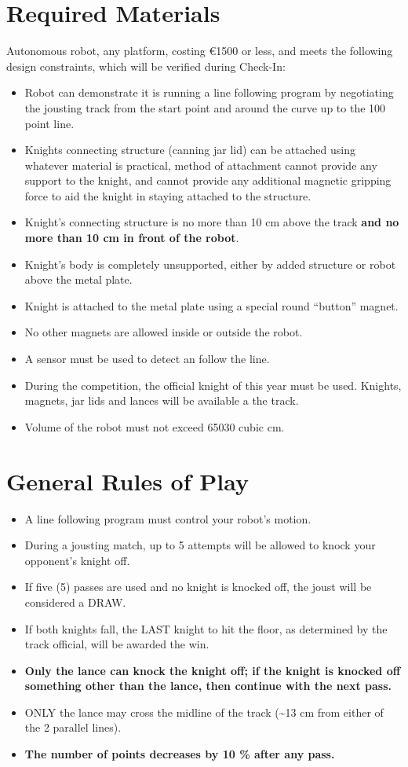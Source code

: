 \documentclass[a4paper,12pt]{article}
\begin{document}
\section{Required Materials}
Autonomous robot, any platform, costing \euro{1500} or less, and meets the following design
constraints, which will be verified during Check-In:
\begin{itemize}
\item Robot can demonstrate it is running a line following program by negotiating the jousting track
from the start point and around the curve up to the 100 point line.
\item Knights connecting structure (canning jar lid) can be attached using whatever material is
practical, method of attachment cannot provide any support to the knight, and cannot provide
any additional magnetic gripping force to aid the knight in staying attached to the structure.
\item Knight’s connecting structure is no more than 10
cm above the track \textbf{and no more than 10 cm in front of the robot}.
\item Knight’s body is completely unsupported, either by added structure or robot above the metal
plate.
\item Knight is attached to the metal plate using a special round “button” magnet.
\item No other magnets are allowed inside or outside the robot.
\item A sensor must be used to detect an follow the line.
\item During the competition, the official knight of this year must be used. Knights, magnets, jar lids and lances will be available a the track.
\item Volume of the robot must not exceed 65030 cubic cm.
\end{itemize}
\section{General Rules of Play}
\begin{itemize}
	\item A line following program must control your robot’s motion.
	\item During a jousting match, up to 5 attempts will be allowed to knock your opponent’s knight off.
	\item If five (5) passes are used and no knight is knocked off, the joust will be considered a DRAW.
	\item If both knights fall, the LAST knight to hit the floor, as determined by the track official, will be
	awarded the win.
	\item \textbf{Only the lance can knock the knight off; if the knight is knocked off something other than the
		lance, then continue with the next pass.}
	\item ONLY the lance may cross the midline of the track (\textasciitilde 13 cm from either of the 2 parallel lines).
	\item \textbf{The number of points decreases by 10 \% after any pass.}
\end{itemize}
\end{document}
